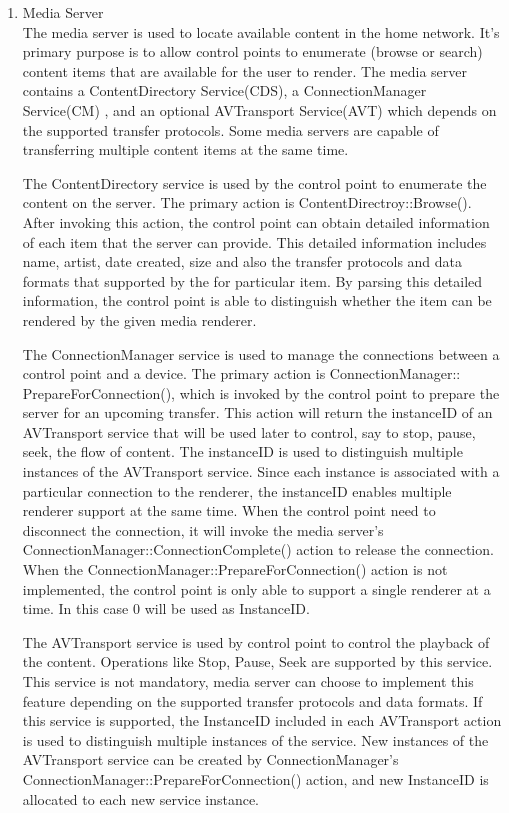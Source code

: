 \begin{enumerate} 
\item Media Server \\ 
The media server is used to locate available content in the home network. It's 
primary purpose is to allow control points to enumerate (browse or search) 
content items that are available for the user to render. The media server 
contains a ContentDirectory Service(CDS), a ConnectionManager Service(CM) 
, and an optional AVTransport Service(AVT) which depends on the supported 
transfer protocols. Some media servers are capable of transferring multiple 
content items at the same time. 

The ContentDirectory service is used by the control point to enumerate the content 
on the server. The primary action is ContentDirectroy::Browse(). After 
invoking this action, the control point can obtain detailed information of each 
item that the server can provide. This detailed information includes name, 
artist, date created, size and also the transfer protocols and data formats that 
supported by the for particular item. By parsing this detailed information, 
the control point is able to distinguish whether the item can be rendered by the 
given media renderer. 

The ConnectionManager service is used to manage the connections between a 
control point and a device. The primary action is 
ConnectionManager:: PrepareForConnection(), which is invoked by the control 
point to prepare the server for an upcoming transfer. This 
action will return the instanceID of an AVTransport service that will be used 
later to control, say to stop, pause, seek, the flow of content. The instanceID is used to distinguish multiple instances of the AVTransport service. Since each instance is associated with a particular connection to the renderer, the instanceID enables multiple renderer support at the same time. When the 
control point need to disconnect the connection, it will invoke the media 
server's ConnectionManager::ConnectionComplete() action to release the 
connection. When the ConnectionManager::PrepareForConnection() action is not 
implemented, the control point is only able to support a single renderer at a 
time. In this case 0 will be used as InstanceID. 

The AVTransport service is used by control point to control the playback of the
content. Operations like Stop, Pause, Seek are supported by this service. This
service is not mandatory, media server can choose to implement this feature
depending on the supported transfer protocols and data formats. If this service
is supported, the InstanceID included in each AVTransport action is used to
distinguish multiple instances of the service. New instances of the AVTransport
service can be created by ConnectionManager's
ConnectionManager::PrepareForConnection() action, and new InstanceID is
allocated to each new service instance.


\end{enumerate}
